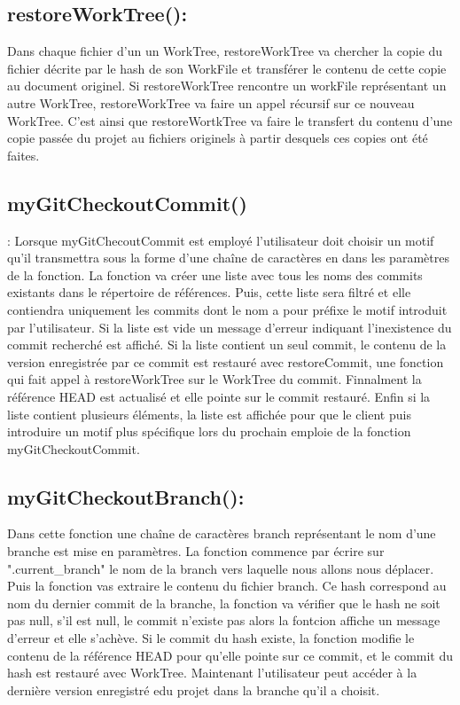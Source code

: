 \documentclass[12pt,francais]{article}
\begin{document}
\subsection{restoreWorkTree():} 
	Dans chaque fichier d'un un WorkTree, restoreWorkTree va chercher la copie du fichier décrite par le hash de son WorkFile et transférer le contenu de cette copie au document originel. Si restoreWorkTree rencontre un workFile représentant un autre WorkTree, restoreWorkTree va faire un appel récursif sur ce nouveau WorkTree. C'est ainsi que restoreWortkTree va faire le transfert du contenu d'une copie passée du projet au fichiers originels à partir desquels ces copies ont été faites. 
\subsection{myGitCheckoutCommit()}:
	Lorsque myGitChecoutCommit est employé l'utilisateur doit choisir un motif qu'il transmettra sous la forme d'une chaîne de caractères en dans les paramètres de la fonction. La fonction va créer une liste avec tous les noms des commits existants dans le répertoire de références. Puis, cette liste sera filtré et elle contiendra uniquement les commits dont le nom a pour préfixe le motif introduit par l'utilisateur. Si la liste est vide un message d'erreur indiquant l'inexistence du commit recherché est affiché. Si la liste contient un seul commit, le contenu de la version enregistrée par ce commit est restauré avec restoreCommit, une fonction qui fait appel à restoreWorkTree sur le WorkTree du commit. Finnalment la référence HEAD est actualisé et elle pointe sur le commit restauré. Enfin si la liste contient plusieurs éléments, la liste est affichée pour que le client puis introduire un motif plus spécifique lors du prochain emploie de la fonction  myGitCheckoutCommit.
\subsection{myGitCheckoutBranch():}
	Dans cette fonction une chaîne de caractères branch représentant le nom d'une branche est mise en paramètres. La fonction commence par écrire sur ".current\_branch" le nom de la branch vers laquelle nous allons nous déplacer. Puis la fonction vas extraire le contenu du fichier branch. Ce hash correspond au nom du dernier commit de la branche, la fonction va vérifier que le hash ne soit pas null, s'il est null, le commit n'existe pas alors la fontcion affiche un message d'erreur et elle s'achève. Si le commit du hash existe, la fonction modifie le contenu de la référence HEAD pour qu'elle pointe sur ce commit, et le commit du hash est restauré avec WorkTree. Maintenant l'utilisateur peut accéder à la dernière version enregistré edu projet dans la branche qu'il a choisit.
	
\end{document}
